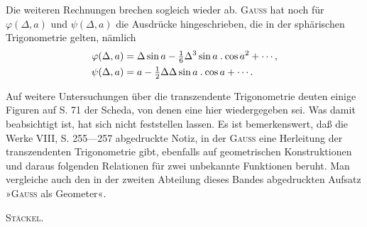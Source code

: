 \indent Die weiteren Rechnungen brechen sogleich wieder ab. \textsc{Gauss} hat noch für \(\varphi(\Delta,a)\) und \(\psi(\Delta,a)\) die Ausdrücke hingeschrieben, die in der sphärischen Trigonometrie gelten, nämlich
\[
\begin{aligned}
\varphi(\Delta,a)&=\Delta\sin a-\tfrac16\Delta^3\sin a\mathbin{.}\cos a^2+\mathinner{\cdotp\cdotp\cdotp},\\
\psi(\Delta,a)&=a-\tfrac12\Delta\Delta\sin a\mathbin{.}\cos a+\mathinner{\cdotp\cdotp\cdotp}.
\end{aligned}
\]

\indent Auf weitere Untersuchungen über die transzendente Trigonometrie deuten einige Figuren auf S. 71 der Scheda, von denen eine hier wiedergegeben sei. Was damit beabsichtigt ist, hat sich nicht feststellen lassen. Es ist bemerkenswert, daß die Werke VIII, S. 255—257 abgedruckte Notiz, in der \textsc{Gauss} eine Herleitung der transzendenten Trigonometrie gibt, ebenfalls auf geometrischen Konstruktionen und daraus folgenden Relationen für zwei unbekannte Funktionen beruht. Man vergleiche auch den in der zweiten Abteilung dieses Bandes abgedruckten Aufsatz »\textsc{Gauss} als Geometer«.
\begin{center}
\end{center}
\par\noindent\hfill\textsc{Stäckel}.
\ClosingRule
\par\endgroup{}
